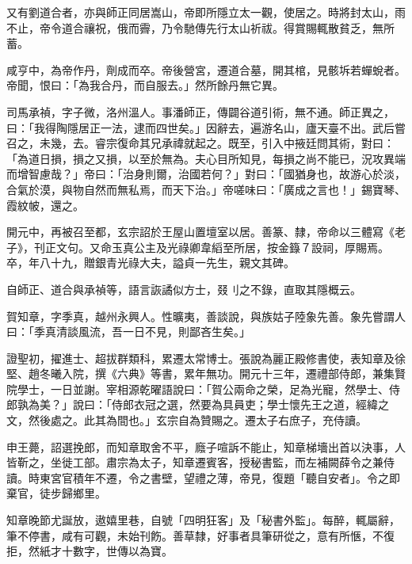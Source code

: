 \begin{pinyinscope}
 又有劉道合者，亦與師正同居嵩山，帝即所隱立太一觀，使居之。時將封太山，雨不止，帝令道合禳祝，俄而霽，乃令馳傳先行太山祈祓。得賞賜輒散貧乏，無所蓄。



 咸亨中，為帝作丹，劑成而卒。帝後營宮，遷道合墓，開其棺，見骸坼若蟬蛻者。帝聞，恨曰：「為我合丹，而自服去。」然所餘丹無它異。



 司馬承禎，字子微，洛州溫人。事潘師正，傳闢谷道引術，無不通。師正異之，曰：「我得陶隱居正一法，逮而四世矣。」因辭去，遍游名山，廬天臺不出。武后嘗召之，未幾，去。睿宗復命其兄承禕就起之。既至，引入中掖廷問其術，對曰：「為道日損，損之又損，以至於無為。夫心目所知見，每損之尚不能已，況攻異端而增智慮哉？」帝曰：「治身則爾，治國若何？」對曰：「國猶身也，故游心於淡，合氣於漠，與物自然而無私焉，而天下治。」帝嗟味曰：「廣成之言也！」錫寶琴、霞紋帔，還之。



 開元中，再被召至都，玄宗詔於王屋山置壇室以居。善篆、隸，帝命以三體寫《老子》，刊正文句。又命玉真公主及光祿卿韋縚至所居，按金籙７設祠，厚賜焉。卒，年八十九，贈銀青光祿大夫，謚貞一先生，親文其碑。



 自師正、道合與承禎等，語言詼譎似方士，叕刂之不錄，直取其隱概云。



 賀知章，字季真，越州永興人。性曠夷，善談說，與族姑子陸象先善。象先嘗謂人曰：「季真清談風流，吾一日不見，則鄙吝生矣。」



 證聖初，擢進士、超拔群類科，累遷太常博士。張說為麗正殿修書使，表知章及徐堅、趙冬曦入院，撰《六典》等書，累年無功。開元十三年，遷禮部侍郎，兼集賢院學士，一日並謝。宰相源乾曜語說曰：「賀公兩命之榮，足為光寵，然學士、侍郎孰為美？」說曰：「侍郎衣冠之選，然要為具員吏；學士懷先王之道，經緯之文，然後處之。此其為間也。」玄宗自為贊賜之。遷太子右庶子，充侍讀。



 申王薨，詔選挽郎，而知章取舍不平，廕子喧訴不能止，知章梯墻出首以決事，人皆靳之，坐徙工部。肅宗為太子，知章遷賓客，授秘書監，而左補闕薛令之兼侍讀。時東宮官積年不遷，令之書壁，望禮之薄，帝見，復題「聽自安者」。令之即棄官，徒步歸鄉里。



 知章晚節尤誕放，遨嬉里巷，自號「四明狂客」及「秘書外監」。每醉，輒屬辭，筆不停書，咸有可觀，未始刊飭。善草隸，好事者具筆研從之，意有所愜，不復拒，然紙才十數字，世傳以為寶。




\end{pinyinscope}
